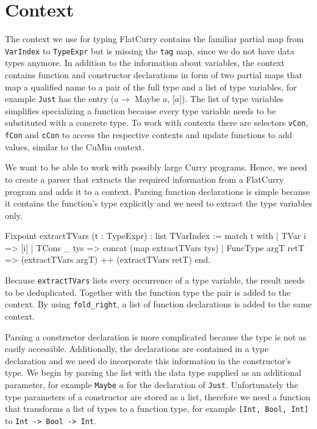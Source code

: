 \documentclass[paper = a4, fleqn, abstract=on, twoside]{scrreprt}
\newcommand{\coqinline}[1]{\texttt{#1}}
\begin{document}
\section{Context}
\label{context}
The context we use for typing FlatCurry contains the familiar partial map from \coqinline{VarIndex} to \coqinline{TypeExpr} but is missing the \coqinline{tag} map, since we do not have data types anymore. In addition to the information about variables, the context contains function and constructor declarations in form of two partial maps that map a qualified name to a pair of the full type and a list of type variables, for example \texttt{Just} has the entry ($a \rightarrow$ Maybe $a$, [$a$]). The list of type variables simplifies specializing a function because every type variable needs to be substituted with a concrete type. To work with contexts there are selectors \coqinline{vCon}, \coqinline{fCon} and \coqinline{cCon} to access the respective contexts and update functions to add values, similar to the CuMin context.\\
\par
We want to be able to work with possibly large Curry programs. Hence, we need to create a parser that extracts the required information from a FlatCurry program and adds it to a context. Parsing function declarations is simple because it contains the function's type explicitly and we need to extract the type variables only.
\begin{coqcode}
Fixpoint extractTVars (t : TypeExpr) : list TVarIndex :=
  match t with
  | TVar i      => [i]
  | TCons _ tys => concat (map extractTVars tys)
  | FuncType argT retT => (extractTVars argT) ++ (extractTVars retT)
  end.
\end{coqcode}
Because \coqinline{extractTVars} lists every occurrence of a type variable, the result needs to be deduplicated. Together with the function type the pair is added to the context. By using \coqinline{fold_right}, a list of function declarations is added to the same context.
\par
Parsing a constructor declaration is more complicated because the type is not as easily accessible. Additionally, the declarations are contained in a type declaration and we need do incorporate this information in the constructor's type. We begin by parsing the list with the data type supplied as an additional parameter, for example \texttt{Maybe} $a$ for the declaration of \texttt{Just}. Unfortunately the type parameters of a constructor are stored as a list, therefore we need a function that transforms a list of types to a function type, for example \texttt{[Int, Bool, Int]} to \texttt{Int -> Bool -> Int}.
\end{document}
